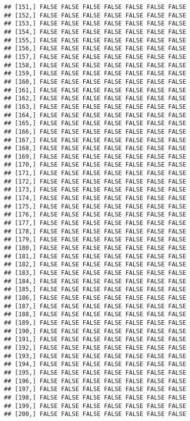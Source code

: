 \documentclass[
]{article}
\begin{document}
\begin{verbatim}
## [151,] FALSE FALSE FALSE FALSE FALSE FALSE FALSE
## [152,] FALSE FALSE FALSE FALSE FALSE FALSE FALSE
## [153,] FALSE FALSE FALSE FALSE FALSE FALSE FALSE
## [154,] FALSE FALSE FALSE FALSE FALSE FALSE FALSE
## [155,] FALSE FALSE FALSE FALSE FALSE FALSE FALSE
## [156,] FALSE FALSE FALSE FALSE FALSE FALSE FALSE
## [157,] FALSE FALSE FALSE FALSE FALSE FALSE FALSE
## [158,] FALSE FALSE FALSE FALSE FALSE FALSE FALSE
## [159,] FALSE FALSE FALSE FALSE FALSE FALSE FALSE
## [160,] FALSE FALSE FALSE FALSE FALSE FALSE FALSE
## [161,] FALSE FALSE FALSE FALSE FALSE FALSE FALSE
## [162,] FALSE FALSE FALSE FALSE FALSE FALSE FALSE
## [163,] FALSE FALSE FALSE FALSE FALSE FALSE FALSE
## [164,] FALSE FALSE FALSE FALSE FALSE FALSE FALSE
## [165,] FALSE FALSE FALSE FALSE FALSE FALSE FALSE
## [166,] FALSE FALSE FALSE FALSE FALSE FALSE FALSE
## [167,] FALSE FALSE FALSE FALSE FALSE FALSE FALSE
## [168,] FALSE FALSE FALSE FALSE FALSE FALSE FALSE
## [169,] FALSE FALSE FALSE FALSE FALSE FALSE FALSE
## [170,] FALSE FALSE FALSE FALSE FALSE FALSE FALSE
## [171,] FALSE FALSE FALSE FALSE FALSE FALSE FALSE
## [172,] FALSE FALSE FALSE FALSE FALSE FALSE FALSE
## [173,] FALSE FALSE FALSE FALSE FALSE FALSE FALSE
## [174,] FALSE FALSE FALSE FALSE FALSE FALSE FALSE
## [175,] FALSE FALSE FALSE FALSE FALSE FALSE FALSE
## [176,] FALSE FALSE FALSE FALSE FALSE FALSE FALSE
## [177,] FALSE FALSE FALSE FALSE FALSE FALSE FALSE
## [178,] FALSE FALSE FALSE FALSE FALSE FALSE FALSE
## [179,] FALSE FALSE FALSE FALSE FALSE FALSE FALSE
## [180,] FALSE FALSE FALSE FALSE FALSE FALSE FALSE
## [181,] FALSE FALSE FALSE FALSE FALSE FALSE FALSE
## [182,] FALSE FALSE FALSE FALSE FALSE FALSE FALSE
## [183,] FALSE FALSE FALSE FALSE FALSE FALSE FALSE
## [184,] FALSE FALSE FALSE FALSE FALSE FALSE FALSE
## [185,] FALSE FALSE FALSE FALSE FALSE FALSE FALSE
## [186,] FALSE FALSE FALSE FALSE FALSE FALSE FALSE
## [187,] FALSE FALSE FALSE FALSE FALSE FALSE FALSE
## [188,] FALSE FALSE FALSE FALSE FALSE FALSE FALSE
## [189,] FALSE FALSE FALSE FALSE FALSE FALSE FALSE
## [190,] FALSE FALSE FALSE FALSE FALSE FALSE FALSE
## [191,] FALSE FALSE FALSE FALSE FALSE FALSE FALSE
## [192,] FALSE FALSE FALSE FALSE FALSE FALSE FALSE
## [193,] FALSE FALSE FALSE FALSE FALSE FALSE FALSE
## [194,] FALSE FALSE FALSE FALSE FALSE FALSE FALSE
## [195,] FALSE FALSE FALSE FALSE FALSE FALSE FALSE
## [196,] FALSE FALSE FALSE FALSE FALSE FALSE FALSE
## [197,] FALSE FALSE FALSE FALSE FALSE FALSE FALSE
## [198,] FALSE FALSE FALSE FALSE FALSE FALSE FALSE
## [199,] FALSE FALSE FALSE FALSE FALSE FALSE FALSE
## [200,] FALSE FALSE FALSE FALSE FALSE FALSE FALSE

\end{verbatim}
\end{document}
